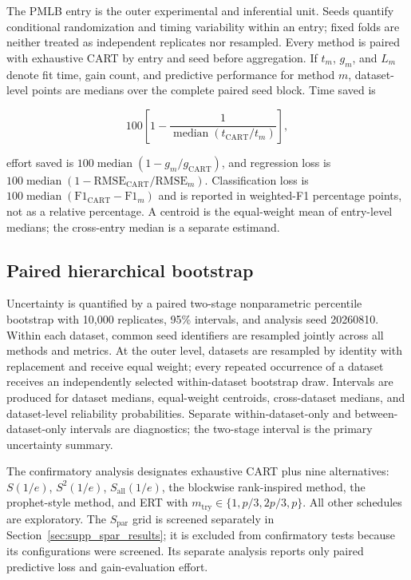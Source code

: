 \documentclass[final,5p,times,twocolumn]{elsarticle}
\begin{document}
The PMLB entry is the outer experimental and inferential unit.  Seeds quantify
conditional randomization and timing variability within an entry; fixed folds
are neither treated as independent replicates nor resampled.  Every method is
paired with exhaustive CART by entry and seed before aggregation.  If
\(t_m\), \(g_m\), and \(L_m\) denote fit time, gain count, and predictive
performance for method \(m\), dataset-level points are medians over the complete
paired seed block.  Time saved is

\[
100\left[1-\frac{1}{\operatorname{median}(t_{\mathrm{CART}}/t_m)}\right],
\]

effort saved is \(100\operatorname{median}(1-g_m/g_{\mathrm{CART}})\), and
regression loss is
\(100\operatorname{median}(1-\mathrm{RMSE}_{\mathrm{CART}}/\mathrm{RMSE}_m)\).
Classification loss is
\(100\operatorname{median}(\mathrm{F1}_{\mathrm{CART}}-\mathrm{F1}_m)\) and is
reported in weighted-F1 percentage points, not as a relative percentage.  A
centroid is the equal-weight mean of entry-level medians; the cross-entry
median is a separate estimand.

\subsection{Paired hierarchical bootstrap}

Uncertainty is quantified by a paired two-stage nonparametric percentile
bootstrap with 10,000 replicates, 95\% intervals, and analysis seed 20260810.
Within each dataset, common seed identifiers are resampled jointly across all
methods and metrics.  At the outer level, datasets are resampled by identity
with replacement and receive equal weight; every repeated occurrence of a
dataset receives an independently selected within-dataset bootstrap draw.
Intervals are produced for dataset medians, equal-weight centroids,
cross-dataset medians, and dataset-level reliability probabilities.  Separate
within-dataset-only and between-dataset-only intervals are diagnostics; the
two-stage interval is the primary uncertainty summary.

The confirmatory analysis designates exhaustive CART plus nine alternatives:
\(S(1/e)\), \(S^2(1/e)\), \(S_{\mathrm{all}}(1/e)\), the blockwise
rank-inspired method, the prophet-style method, and ERT with
\(m_{\mathrm{try}}\in\{1,p/3,2p/3,p\}\).  All other schedules are exploratory.
The \(S_{\mathrm{par}}\) grid is screened separately in
Section~\ref{sec:supp_spar_results}; it is excluded from confirmatory tests
because its configurations were screened.  Its separate analysis reports only
paired predictive loss and gain-evaluation effort.
\end{document}
